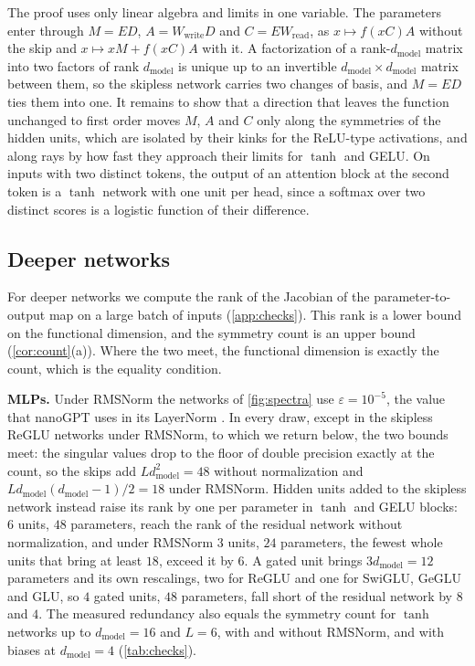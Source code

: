 \documentclass[10pt]{article}
\theoremstyle{definition}
\theoremstyle{remark}
\newcommand{\Wread}{W_{\mathrm{read}}}
\newcommand{\Wwrite}{W_{\mathrm{write}}}
\newcommand{\dm}{d_{\mathrm{model}}}
\newcommand{\para}[1]{\smallskip\noindent\textbf{#1}\hspace{0.5em}}
\begin{document}
The proof uses only linear algebra and limits in one variable. The parameters enter through $M = ED$, $A = \Wwrite D$ and $C = E\Wread$, as $x \mapsto f(xC)A$ without the skip and $x \mapsto xM + f(xC)A$ with it. A factorization of a rank-$\dm$ matrix into two factors of rank $\dm$ is unique up to an invertible $\dm \times \dm$ matrix between them, so the skipless network carries two changes of basis, and $M = ED$ ties them into one. It remains to show that a direction that leaves the function unchanged to first order moves $M$, $A$ and $C$ only along the symmetries of the hidden units, which are isolated by their kinks for the ReLU-type activations, and along rays by how fast they approach their limits for $\tanh$ and GELU. On inputs with two distinct tokens, the output of an attention block at the second token is a $\tanh$ network with one unit per head, since a softmax over two distinct scores is a logistic function of their difference.

\subsection{Deeper networks}\label{sec:measured}

For deeper networks we compute the rank of the Jacobian of the parameter-to-output map on a large batch of inputs (\cref{app:checks}). This rank is a lower bound on the functional dimension, and the symmetry count is an upper bound (\cref{cor:count}(a)). Where the two meet, the functional dimension is exactly the count, which is the equality condition.


\para{MLPs.} Under RMSNorm the networks of \cref{fig:spectra} use $\varepsilon = 10^{-5}$, the value that nanoGPT uses in its LayerNorm \citep{karpathy2023nanogpt}. In every draw, except in the skipless ReGLU networks under RMSNorm, to which we return below, the two bounds meet: the singular values drop to the floor of double precision exactly at the count, so the skips add $L\dm^2 = 48$ without normalization and $L\dm(\dm-1)/2 = 18$ under RMSNorm. Hidden units added to the skipless network instead raise its rank by one per parameter in $\tanh$ and GELU blocks: $6$ units, $48$ parameters, reach the rank of the residual network without normalization, and under RMSNorm $3$ units, $24$ parameters, the fewest whole units that bring at least $18$, exceed it by $6$. A gated unit brings $3\dm = 12$ parameters and its own rescalings, two for ReGLU and one for SwiGLU, GeGLU and GLU, so $4$ gated units, $48$ parameters, fall short of the residual network by $8$ and $4$. The measured redundancy also equals the symmetry count for $\tanh$ networks up to $\dm = 16$ and $L = 6$, with and without RMSNorm, and with biases at $\dm = 4$ (\cref{tab:checks}).
\end{document}
